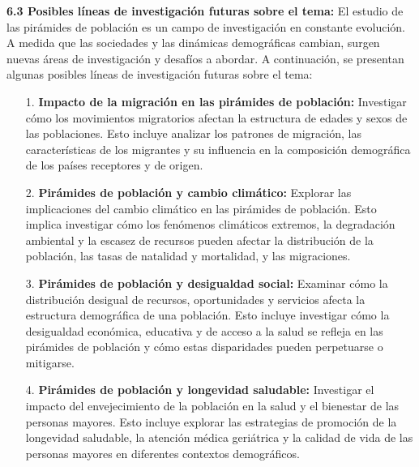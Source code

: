 \documentclass[8pt,a4paper]{beamer}
\begin{document}
{\begin{frame}{}
\begin{block}{}
\end{block}
\end{frame}


\begin{frame}{}
\begin{block}{\textbf{6.3 Posibles líneas de investigación futuras sobre el tema:}}
\justifying
El estudio de las pirámides de población es un campo de investigación en constante evolución. A medida que las sociedades y las dinámicas demográficas cambian, surgen nuevas áreas de investigación y desafíos a abordar. A continuación, se presentan algunas posibles líneas de investigación futuras sobre el tema:
\begin{enumerate}
\justifying
\item[1.] \textbf{Impacto de la migración en las pirámides de población:} Investigar cómo los movimientos migratorios afectan la estructura de edades y sexos de las poblaciones. Esto incluye analizar los patrones de migración, las características de los migrantes y su influencia en la composición demográfica de los países receptores y de origen.

\item[2.] \textbf{Pirámides de población y cambio climático:} Explorar las implicaciones del cambio climático en las pirámides de población. Esto implica investigar cómo los fenómenos climáticos extremos, la degradación ambiental y la escasez de recursos pueden afectar la distribución de la población, las tasas de natalidad y mortalidad, y las migraciones.

\item[3.] \textbf{Pirámides de población y desigualdad social:} Examinar cómo la distribución desigual de recursos, oportunidades y servicios afecta la estructura demográfica de una población. Esto incluye investigar cómo la desigualdad económica, educativa y de acceso a la salud se refleja en las pirámides de población y cómo estas disparidades pueden perpetuarse o mitigarse.

\end{enumerate}
\end{block}
\end{frame}

\begin{frame}{}
\begin{block}{}
\justifying
\begin{enumerate}
\justifying
\item[4.] \textbf{Pirámides de población y longevidad saludable:} Investigar el impacto del envejecimiento de la población en la salud y el bienestar de las personas mayores. Esto incluye explorar las estrategias de promoción de la longevidad saludable, la atención médica geriátrica y la calidad de vida de las personas mayores en diferentes contextos demográficos.


\end{enumerate}
\end{block}
\end{frame}}
\end{document}
